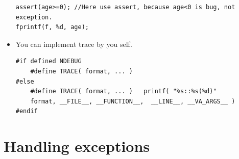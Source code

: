 \documentclass[a4paper,11pt,twoside]{book}
\begin{document}
\begin{itemize}
\begin{lstlisting}[numbers=none]
assert(age>=0); //Here use assert, because age<0 is bug, not exception.
fprintf(f, %d, age);
\end{lstlisting}
	
	\item You can implement trace by you self.
\begin{lstlisting}[numbers=none]
#if defined NDEBUG
	#define TRACE( format, ... )
#else
	#define TRACE( format, ... )   printf( "%s::%s(%d)"
	format, __FILE__, __FUNCTION__,  __LINE__, __VA_ARGS__ )
#endif
	\end{lstlisting}
	
\end{itemize}

\section{Handling exceptions}
\end{document}
